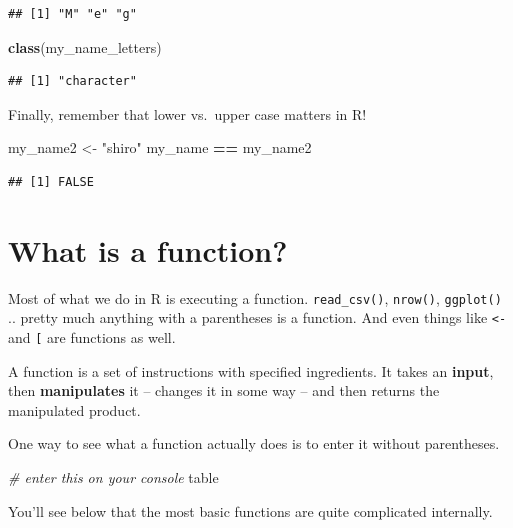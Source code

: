 \documentclass[
]{book}
\newenvironment{Shaded}{\begin{snugshade}}{\end{snugshade}}
\newcommand{\CommentTok}[1]{\textcolor[rgb]{0.56,0.35,0.01}{\textit{#1}}}
\newcommand{\KeywordTok}[1]{\textcolor[rgb]{0.13,0.29,0.53}{\textbf{#1}}}
\newcommand{\NormalTok}[1]{#1}
\newcommand{\OperatorTok}[1]{\textcolor[rgb]{0.81,0.36,0.00}{\textbf{#1}}}
\newcommand{\StringTok}[1]{\textcolor[rgb]{0.31,0.60,0.02}{#1}}
\theoremstyle{definition}
\theoremstyle{definition}
\theoremstyle{definition}
\theoremstyle{definition}
\theoremstyle{remark}
\begin{document}
\begin{verbatim}
## [1] "M" "e" "g"
\end{verbatim}

\begin{Shaded}
\begin{Highlighting}[]
\KeywordTok{class}\NormalTok{(my_name_letters)}
\end{Highlighting}
\end{Shaded}

\begin{verbatim}
## [1] "character"
\end{verbatim}

Finally, remember that lower vs.~upper case matters in R!

\begin{Shaded}
\begin{Highlighting}[]
\NormalTok{my_name2 <-}\StringTok{ "shiro"}
\NormalTok{my_name }\OperatorTok{==}\StringTok{ }\NormalTok{my_name2}
\end{Highlighting}
\end{Shaded}

\begin{verbatim}
## [1] FALSE
\end{verbatim}

\hypertarget{what-is-a-function}{%
\section{What is a function?}\label{what-is-a-function}}

Most of what we do in R is executing a function. \texttt{read\_csv()}, \texttt{nrow()}, \texttt{ggplot()} .. pretty much anything with a parentheses is a function. And even things like \texttt{\textless{}-} and \texttt{{[}} are functions as well.

A function is a set of instructions with specified ingredients. It takes an \textbf{input}, then \textbf{manipulates} it -- changes it in some way -- and then returns the manipulated product.

One way to see what a function actually does is to enter it without parentheses.

\begin{Shaded}
\begin{Highlighting}[]
\CommentTok{# enter this on your console}
\NormalTok{table}
\end{Highlighting}
\end{Shaded}

You'll see below that the most basic functions are quite complicated internally.
\end{document}

